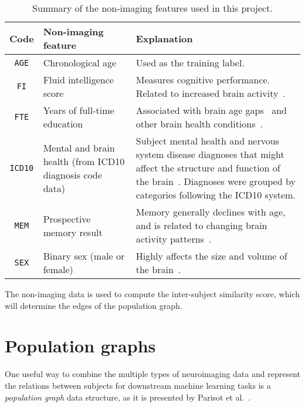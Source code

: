 \begin{table}[h]
    \caption{Summary of the non-imaging features used in this project.}\label{table:phenotype-features}
    \centering
    \begin{tabular}{cp{6cm}p{7.5cm}}
        \hline
    \textbf{Code} & \textbf{Non-imaging feature} & \textbf{Explanation} \\ \hline
    \texttt{AGE} & Chronological age &  Used as the training label. \\
    \texttt{FI} & Fluid intelligence score &  Measures cognitive performance. Related to increased brain activity~\cite{gray2003neural}. \\
    \texttt{FTE} & Years of full-time education &  Associated with brain age gaps~\cite{steffener2016differences} and other brain health conditions~\cite{brayne2010education}.\\
    \texttt{ICD10} & Mental and brain health (from ICD10 diagnosis code data) & Subject mental health and nervous system disease diagnoses that might affect the structure and function of the brain~\cite{kaufmann2019}. Diagnoses were grouped by categories following the ICD10 system\footnotemark[\value{footnote}]. \\
    \texttt{MEM} & Prospective memory result & Memory generally declines with age, and is related to changing brain activity patterns~\cite{grady2000changes, kliegel2006delayed}. \\
    \texttt{SEX} & Binary sex (male or female) & Highly affects the size and volume of the brain~\cite{ruigrok2014meta}. \\ \hline
    \end{tabular}
\end{table}

The non-imaging data is used to compute the inter-subject similarity score, which will determine the edges of the population graph.

\section{Population graphs}
\label{population-graphs}

One useful way to combine the multiple types of neuroimaging data and represent the relations between subjects for downstream machine learning tasks is a \textit{population graph} data structure, as it is presented by Parisot et al.~\cite{parisot2018disease}.


